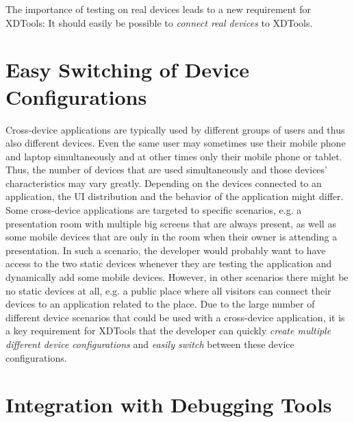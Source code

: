 The importance of testing on real devices leads to a new requirement for XDTools: It should easily be possible to \emph{connect real devices} to XDTools. 

\section{Easy Switching of Device Configurations}

Cross-device applications are typically used by different groups of users and thus also different devices. Even the same user may sometimes use their mobile phone and laptop simultaneously and at other times only their mobile phone or tablet. Thus, the number of devices that are used simultaneously and those devices' characteristics may vary greatly. Depending on the devices connected to an application, the UI distribution and the behavior of the application might differ. Some cross-device applications are targeted to specific scenarios, e.g. a presentation room with multiple big screens that are always present, as well as some mobile devices that are only in the room when their owner is attending a presentation. In such a scenario, the developer would probably want to have access to the two static devices whenever they are testing the application and dynamically add some mobile devices. However, in other scenarios there might be no static devices at all, e.g. a public place where all visitors can connect their devices to an application related to the place. Due to the large number of different device scenarios that could be used with a cross-device application, it is a key requirement for XDTools that the developer can quickly \emph{create multiple different device configurations} and \emph{easily switch} between these device configurations. 

\section{Integration with Debugging Tools}


